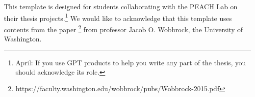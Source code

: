 This template is designed for students collaborating with the \ac{PEACH} Lab on their thesis projects.\footnote{April: If you use GPT products to help you write any part of the thesis, you should acknowledge its role.}
We would like to acknowledge that this template uses contents from the paper \footnote{https://faculty.washington.edu/wobbrock/pubs/Wobbrock-2015.pdf} from professor Jacob O. Wobbrock, the University of Washington.